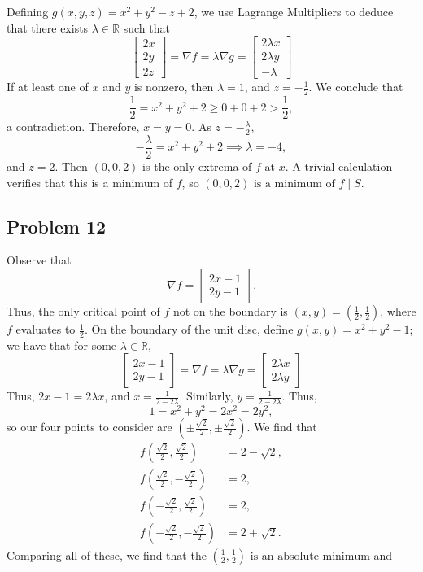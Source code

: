 \documentclass[11pt]{article}
\renewcommand{\grad}{\nabla}
\begin{document}
Defining $g(x, y, z) = x^{2} + y^{2} - z + 2$, we use Lagrange Multipliers to deduce that there exists $\lambda \in \mathbb{R}$ such that
\[
	\begin{bmatrix} 2x \\ 2y \\ 2z \end{bmatrix} = \grad f = \lambda \grad g = \begin{bmatrix} 2\lambda x \\ 2\lambda y \\ -\lambda \end{bmatrix} 
\]
If at least one of $x$ and $y$ is nonzero, then $\lambda = 1$, and $z = -\tfrac{1}{2}$. We conclude that
\[
	\frac{1}{2} = x^{2} + y^{2} + 2 \ge 0 + 0 + 2 > \frac{1}{2},
\]
a contradiction. Therefore, $x = y = 0$. As $z = -\tfrac{\lambda}{2}$,
\[
	-\frac{\lambda}{2} = x^{2} + y^{2} + 2 \implies \lambda = -4,
\]
and $z = 2$. Then $(0, 0, 2)$ is the only extrema of $f$ at $x$. A trivial calculation verifies that this is a minimum of $f$, so $\boxed{\text{$(0, 0, 2)$ is a minimum of $f \mid S$}}$.


\subsection*{Problem 12}

Observe that
\[
	\grad f = \begin{bmatrix} 2x - 1 \\ 2y - 1 \end{bmatrix}.
\]
Thus, the only critical point of $f$ not on the boundary is $(x, y) = \left(\tfrac{1}{2}, \tfrac{1}{2}\right)$, where $f$ evaluates to $\tfrac{1}{2}$. On the boundary of the unit disc, define $g(x, y) = x^{2} + y^{2} - 1$; we have that for some $\lambda \in \mathbb{R}$,
\[
	\begin{bmatrix} 2x - 1 \\ 2y - 1 \end{bmatrix} = \grad f = \lambda \grad g = \begin{bmatrix} 2\lambda x \\ 2\lambda y \end{bmatrix}
\]
Thus, $2x - 1 = 2\lambda x$, and $x = \tfrac{1}{2 - 2\lambda}$. Similarly, $y = \tfrac{1}{2 - 2\lambda}$. Thus,
\[
	1 = x^{2} + y^{2} = 2x^{2} = 2y^{2},
\]
so our four points to consider are $\left(\pm \tfrac{\sqrt{2}}{2}, \pm \tfrac{\sqrt{2}}{2}\right)$. We find that
\begin{align*}
	f \left( \frac{\sqrt{2}}{2}, \frac{\sqrt{2}}{2} \right) &= 2 - \sqrt{2}, \\
	f \left( \frac{\sqrt{2}}{2}, -\frac{\sqrt{2}}{2} \right) &= 2, \\
	f \left( -\frac{\sqrt{2}}{2}, \frac{\sqrt{2}}{2} \right) &= 2, \\
	f \left( -\frac{\sqrt{2}}{2}, -\frac{\sqrt{2}}{2} \right) &= 2 + \sqrt{2}.
\end{align*}
Comparing all of these, we find that the $\boxed{\text{$\left( \tfrac{1}{2}, \tfrac{1}{2} \right)$ is an absolute minimum}}$ and 
\end{document}
